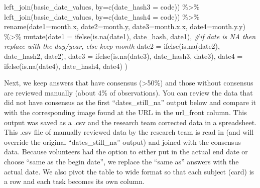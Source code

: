 \documentclass[
]{article}
\newenvironment{Shaded}{\begin{snugshade}}{\end{snugshade}}
\newcommand{\AttributeTok}[1]{\textcolor[rgb]{0.77,0.63,0.00}{#1}}
\newcommand{\CommentTok}[1]{\textcolor[rgb]{0.56,0.35,0.01}{\textit{#1}}}
\newcommand{\FunctionTok}[1]{\textcolor[rgb]{0.00,0.00,0.00}{#1}}
\newcommand{\NormalTok}[1]{#1}
\newcommand{\OtherTok}[1]{\textcolor[rgb]{0.56,0.35,0.01}{#1}}
\newcommand{\SpecialCharTok}[1]{\textcolor[rgb]{0.00,0.00,0.00}{#1}}
\newcommand{\StringTok}[1]{\textcolor[rgb]{0.31,0.60,0.02}{#1}}
\begin{document}
\begin{Shaded}
\begin{Highlighting}[]
                      \FunctionTok{left\_join}\NormalTok{(basic\_date\_values, }\AttributeTok{by=}\FunctionTok{c}\NormalTok{(}\StringTok{\textquotesingle{}date\_hash3\textquotesingle{}} \OtherTok{=} \StringTok{\textquotesingle{}code\textquotesingle{}}\NormalTok{)) }\SpecialCharTok{\%\textgreater{}\%} 
                        \FunctionTok{left\_join}\NormalTok{(basic\_date\_values, }\AttributeTok{by=}\FunctionTok{c}\NormalTok{(}\StringTok{\textquotesingle{}date\_hash4\textquotesingle{}} \OtherTok{=} \StringTok{\textquotesingle{}code\textquotesingle{}}\NormalTok{)) }\SpecialCharTok{\%\textgreater{}\%} 
                        \FunctionTok{rename}\NormalTok{(}\AttributeTok{date1=}\NormalTok{month.x, }\AttributeTok{date2=}\NormalTok{month.y, }\AttributeTok{date3=}\NormalTok{month.x.x, }\AttributeTok{date4=}\NormalTok{month.y.y) }\SpecialCharTok{\%\textgreater{}\%}
                          \FunctionTok{mutate}\NormalTok{(}\AttributeTok{date1 =} \FunctionTok{ifelse}\NormalTok{(}\FunctionTok{is.na}\NormalTok{(date1), date\_hash, date1), }\CommentTok{\#if date is NA then replace with the day/year, else keep month }
                                 \AttributeTok{date2 =} \FunctionTok{ifelse}\NormalTok{(}\FunctionTok{is.na}\NormalTok{(date2), date\_hash2, date2),}
                                 \AttributeTok{date3 =} \FunctionTok{ifelse}\NormalTok{(}\FunctionTok{is.na}\NormalTok{(date3), date\_hash3, date3),}
                                 \AttributeTok{date4 =} \FunctionTok{ifelse}\NormalTok{(}\FunctionTok{is.na}\NormalTok{(date4), date\_hash4, date4)}
\NormalTok{                          )}
\end{Highlighting}
\end{Shaded}

Next, we keep answers that have consensus (\textgreater50\%) and those
without consensus are reviewed manually (about 4\% of observations). You
can review the data that did not have consensus as the first
``dates\_still\_na'' output below and compare it with the corresponding
image found at the URL in the url\_front column. This output was saved
as a .csv and the research team corrected data in a spreadsheet. This
.csv file of manually reviewed data by the research team is read in (and
will override the original ``dates\_still\_na'' output) and joined with
the consensus data. Because volunteers had the option to either put in
the actual end date or choose ``same as the begin date'', we replace the
``same as'' answers with the actual date. We also pivot the table to
wide format so that each subject (card) is a row and each task becomes
its own column.
\end{document}
